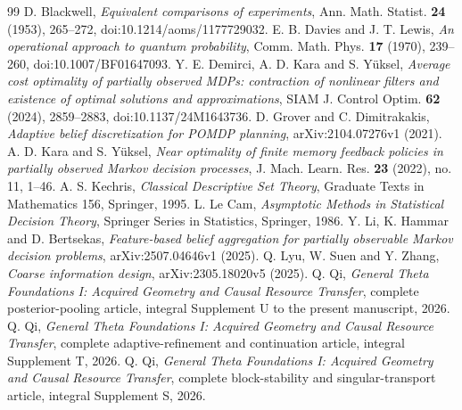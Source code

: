 \begin{thebibliography}{99}
 D. Blackwell, \emph{Equivalent comparisons of experiments}, Ann. Math. Statist. \textbf{24} (1953), 265--272, doi:10.1214/aoms/1177729032.
 E. B. Davies and J. T. Lewis, \emph{An operational approach to quantum probability}, Comm. Math. Phys. \textbf{17} (1970), 239--260, doi:10.1007/BF01647093.
 Y. E. Demirci, A. D. Kara and S. Y\"uksel, \emph{Average cost optimality of partially observed MDPs: contraction of nonlinear filters and existence of optimal solutions and approximations}, SIAM J. Control Optim. \textbf{62} (2024), 2859--2883, doi:10.1137/24M1643736.
 D. Grover and C. Dimitrakakis, \emph{Adaptive belief discretization for POMDP planning}, arXiv:2104.07276v1 (2021).
 A. D. Kara and S. Y\"uksel, \emph{Near optimality of finite memory feedback policies in partially observed Markov decision processes}, J. Mach. Learn. Res. \textbf{23} (2022), no. 11, 1--46.
 A. S. Kechris, \emph{Classical Descriptive Set Theory}, Graduate Texts in Mathematics 156, Springer, 1995.
 L. Le Cam, \emph{Asymptotic Methods in Statistical Decision Theory}, Springer Series in Statistics, Springer, 1986.
 Y. Li, K. Hammar and D. Bertsekas, \emph{Feature-based belief aggregation for partially observable Markov decision problems}, arXiv:2507.04646v1 (2025).
 Q. Lyu, W. Suen and Y. Zhang, \emph{Coarse information design}, arXiv:2305.18020v5 (2025).
 Q. Qi, \emph{General Theta Foundations I: Acquired Geometry and Causal Resource Transfer}, complete posterior-pooling article, integral Supplement U to the present manuscript, 2026.
 Q. Qi, \emph{General Theta Foundations I: Acquired Geometry and Causal Resource Transfer}, complete adaptive-refinement and continuation article, integral Supplement T, 2026.
 Q. Qi, \emph{General Theta Foundations I: Acquired Geometry and Causal Resource Transfer}, complete block-stability and singular-transport article, integral Supplement S, 2026.
\end{thebibliography}
